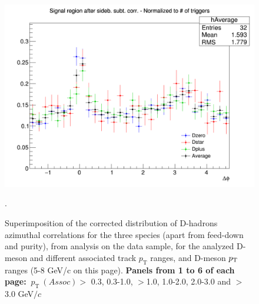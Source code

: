 \begin{figure}
{\includegraphics[width=0.48\linewidth]{figures/Averages/AzimCorrDistr_Canvas_PtIntBins5to8_PoolInt_thr3dotto99dot_Superimp.png}}
\caption{Superimposition of the corrected distribution of D-hadrons azimuthal correlations for the three species (apart from feed-down and purity), from analysis on the data sample, for the analyzed D-meson and different associated track $p_\text{T}$ ranges, and D-meson $p_{\rm T}$ ranges (5-8 GeV/c on this page). \textbf{Panels from 1 to 6 of each page:} $ \ p_\text{T}~(Assoc)>$ 0.3, 0.3-1.0, $>$1.0, 1.0-2.0, 2.0-3.0 and $>$3.0 GeV$/c$}.
\label{fig:Data_Res_D0DpDs2}
\end{figure}
\newpage
